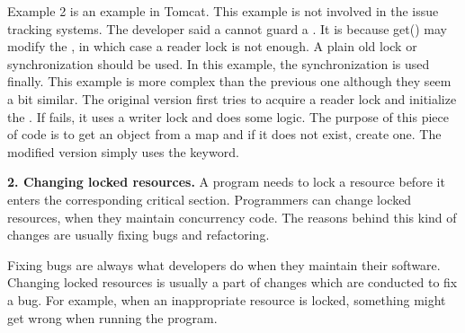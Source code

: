 


Example 2 is an example in Tomcat. This example is not involved in the issue tracking systems. The developer said a  cannot guard a . It is because get() may modify the , in which case a reader lock is not enough. A plain old lock or synchronization should be used. In this example, the synchronization is used finally. This example is more complex than the previous one although they seem a bit similar. The original version first tries to acquire a reader lock and initialize the . If fails, it uses a writer lock and does some logic. The purpose of this piece of code is to get an object from a map and if it does not exist, create one. The modified version simply uses the  keyword.%



\noindent
\textbf{2. Changing locked resources.} A program needs to lock a resource before it enters the corresponding critical section. Programmers can change locked resources, when they maintain concurrency code. The reasons behind this kind of changes are usually fixing bugs and refactoring.%

Fixing bugs are always what developers do when they maintain their software. Changing locked resources is usually a part of changes which are conducted to fix a bug. For example, when an inappropriate resource is locked, something might get wrong when running the program.


